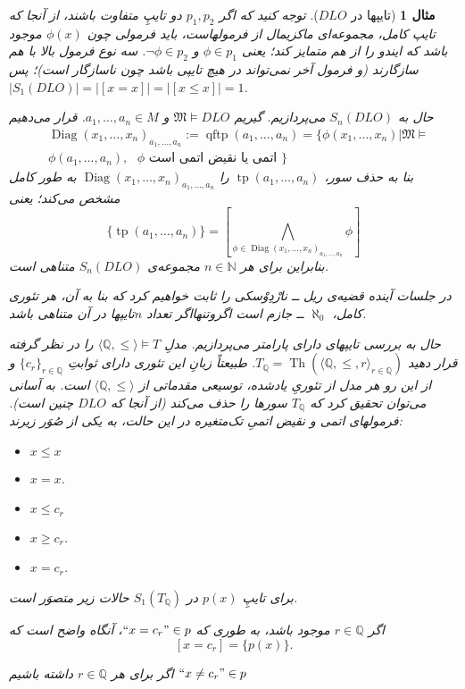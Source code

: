 \documentclass[12pt,a4paper]{report}
\theoremstyle{colorhead}
\newtheorem{mesal}[thm]{مثال}
\DeclareMathOperator{\Th}{Th}
\DeclareMathOperator{\diag}{Diag}
\DeclareMathOperator{\qftp}{qftp}
\DeclareMathOperator{\tp}{tp}
\begin{document}
\begin{mesal}[تایپها در
$DLO$]
توجه کنید که اگر 
$p_1,p_2$
دو تایپِ متفاوت باشند، از آنجا که تایپ کامل، مجموعه‌ای ماکزیمال از فرمولهاست، باید
فرمولی چون
$\phi(x)$
موجود باشد که ایندو را از هم متمایز کند؛ یعنی
$\phi\in p_1$
و
$\neg \phi\in p_2$.
سه نوع فرمول بالا با هم سازگارند (و فرمول آخر نمی‌تواند در هیچ تایپی باشد چون ناسازگار است)؛ پس
$|S_1(DLO)|=|[x=x]|=|[x\leq x]|=1$.
\par 
حال به
$S_n(DLO)$
می‌پردازیم.
گیریم
$\mathfrak{M}\models DLO$
و
$a_1,\ldots,a_n\in M$.
قرار می‌دهیم
\begin{align*}
&
\diag(x_1,\ldots,x_n)_{a_1,\ldots,a_n}:=\qftp(a_1,\ldots,a_n)=
\{\phi(x_1,\ldots,x_n)|\mathfrak{M}\models \\
&
\phi(a_1,\ldots,a_n), \text{ $\phi$ اتمی یا نقیض اتمی است }
\}
\end{align*}
بنا به حذف سور،
$\tp(a_1,\ldots,a_n)$
را
$\diag(x_1,\ldots,x_n)_{a_1,\ldots,a_n}$
به طور کامل مشخص می‌کند؛ یعنی
\[
\{\tp(a_1,\ldots,a_n)\}=[\bigwedge_{\phi\in \diag(x_1,\ldots,x_n)_{a_1,\ldots,a_n} }\phi]
\]
بنابراین
برای هر
$n\in \mathbb{N}$
مجموعه‌ی
$S_n(DLO)$
متناهی است.
\par 
در جلسات آینده قضیه‌ی
ریل‌ ــ نارْدِوْسکی
را ثابت خواهیم کرد که بنا به آن، هر تئوری کامل،
$\aleph_0$
ــ
جازم است اگروتنهااگر تعداد
$n$تایپها
 در آن متناهی باشد. 
\par 
حال به بررسی تایپهای دارای پارامتر می‌پردازیم. مدلِ
$\langle \mathbb{Q},\leq\rangle \models T$
را در نظر گرفته قرار دهید
$T_\mathbb{Q}=\Th(\langle\mathbb{Q},\leq,r\rangle_{r\in \mathbb{Q}})$.
طبیعتاً زبانِ این تئوری دارای ثوابتِ
$\{c_r\}_{r\in \mathbb{Q}}$
و از این رو هر مدل از تئوریِ یادشده، توسیعی مقدماتی از
$\langle \mathbb{Q},\leq\rangle$
است. 
به آسانی می‌توان تحقیق کرد که
$T_\mathbb{Q}$
سورها را حذف می‌کند (از آنجا که
$DLO$
چنین است). فرمولهای اتمی و نقیض اتمیِ تک‌متغیره در این حالت، به یکی از صُوَر زیرند:
\begin{itemize}
\item $x\leq x$
\item $x=x$.
\item $x\leq c_r$
\item $x\geq c_r$.
\item $x=c_r$.
\end{itemize}
برای تایپِ
$p(x)$
 در
$S_1(T_\mathbb{Q})$
حالات زیر متصوَر است.
\par 
اگر
$r\in \mathbb{Q}$
موجود باشد، به طوری که 
$``x=c_r"\in p$، 
آنگاه واضح است که 
\[
[x=c_r]=\{p(x)\}.
\]
\item
اگر
برای هر
$r\in \mathbb{Q}$
داشته باشیم
$``x\not=c_r"\in p$

\end{mesal}
\end{document}
